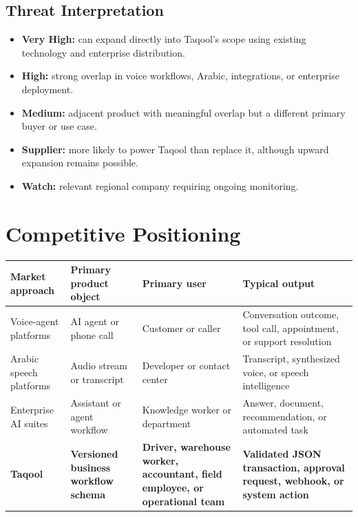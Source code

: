 \documentclass[10.5pt,a4paper]{article}
\newcommand{\BrandName}{Taqool}
\begin{document}
\subsection{Threat Interpretation}

\begin{itemize}
  \item \textbf{Very High:} can expand directly into \BrandName{}'s scope using existing technology and enterprise distribution.
  \item \textbf{High:} strong overlap in voice workflows, Arabic, integrations, or enterprise deployment.
  \item \textbf{Medium:} adjacent product with meaningful overlap but a different primary buyer or use case.
  \item \textbf{Supplier:} more likely to power \BrandName{} than replace it, although upward expansion remains possible.
  \item \textbf{Watch:} relevant regional company requiring ongoing monitoring.
\end{itemize}

\section{Competitive Positioning}

\begin{tabularx}{\textwidth}{L{34mm}L{40mm}L{38mm}Y}
\toprule
\textbf{Market approach} & \textbf{Primary product object} & \textbf{Primary user} & \textbf{Typical output} \\
\midrule
Voice-agent platforms
& AI agent or phone call
& Customer or caller
& Conversation outcome, tool call, appointment, or support resolution \\

Arabic speech platforms
& Audio stream or transcript
& Developer or contact center
& Transcript, synthesized voice, or speech intelligence \\

Enterprise AI suites
& Assistant or agent workflow
& Knowledge worker or department
& Answer, document, recommendation, or automated task \\

\textbf{\BrandName}
& \textbf{Versioned business workflow schema}
& \textbf{Driver, warehouse worker, accountant, field employee, or operational team}
& \textbf{Validated JSON transaction, approval request, webhook, or system action} \\
\bottomrule
\end{tabularx}
\end{document}
